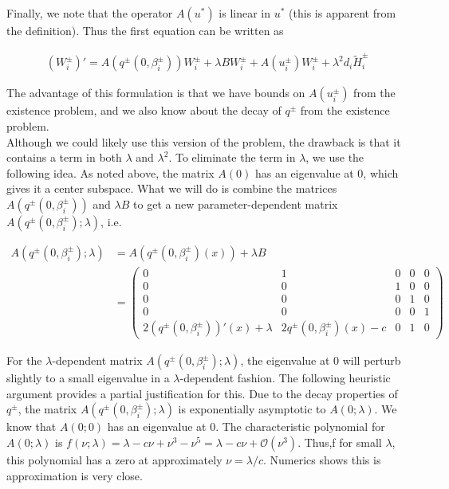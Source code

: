 \documentclass[12pt]{article}
\begin{document}
Finally, we note that the operator $A(u^*)$ is linear in $u^*$ (this is apparent from the definition). Thus the first equation can be written as 

\begin{align*}
(W_i^\pm)' = A(q^\pm(0, \beta_i^\pm)) W_i^\pm + \lambda B W_i^\pm + A(u_i^\pm) W_i^\pm + \lambda^2 d_i \tilde{H}_i^\pm
\end{align*}

The advantage of this formulation is that we have bounds on $A(u_i^\pm)$ from the existence problem, and we also know about the decay of $q^\pm$ from the existence problem.\\

Although we could likely use this version of the problem, the drawback is that it contains a term in both $\lambda$ and $\lambda^2$. To eliminate the term in $\lambda$, we use the following idea. As noted above, the matrix $A(0)$ has an eigenvalue at 0, which gives it a center subspace. What we will do is combine the matrices $A(q^\pm(0, \beta_i^\pm))$ and $\lambda B$ to get a new parameter-dependent matrix $A(q^\pm(0, \beta_i^\pm); \lambda)$, i.e. 

\begin{align*}
A(q^\pm(0, \beta_i^\pm); \lambda) &= A(q^\pm(0, \beta_i^\pm)(x)) + \lambda B \\
&= \begin{pmatrix}0 & 1 & 0 & 0 & 0 \\0 & 0 & 1 & 0 & 0 \\0 & 0 & 0 & 1 & 0 \\0 & 0 & 0 & 0 & 1 \\
2 (q^\pm(0, \beta_i^\pm))'(x) + \lambda & 2 q^\pm(0, \beta_i^\pm)(x) - c & 0 & 1 & 0 \end{pmatrix}
\end{align*}

For the $\lambda$-dependent matrix $A(q^\pm(0, \beta_i^\pm); \lambda)$, the eigenvalue at 0 will perturb slightly to a small eigenvalue in a $\lambda$-dependent fashion. The following heuristic argument provides a partial justification for this. Due to the decay properties of $q^\pm$, the matrix $A(q^\pm(0, \beta_i^\pm); \lambda)$ is exponentially asymptotic to $A(0; \lambda)$. We know that $A(0; 0)$ has an eigenvalue at 0. The characteristic polynomial for $A(0; \lambda)$ is $f(\nu; \lambda) = \lambda - c \nu + \nu^3 - \nu^5 = \lambda - c \nu + \mathcal{O}(\nu^3)$. Thus,f for small $\lambda$, this polynomial has a zero at approximately $\nu = \lambda / c$. Numerics shows this is approximation is very close.\\
\end{document}
